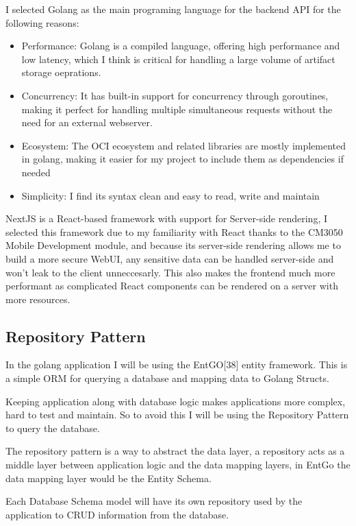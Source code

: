 \documentclass{article}
\begin{document}
  I selected Golang as the main programing language for the backend API for the following reasons:

  \begin{itemize}
    \item Performance: Golang is a compiled language, offering high performance and low latency, which I think is critical for handling a large volume of artifact storage oeprations.
    \item Concurrency: It has built-in support for concurrency through goroutines, making it perfect for handling multiple simultaneous requests without the need for an external webserver.
    \item Ecosystem: The OCI ecosystem and related libraries are mostly implemented in golang, making it easier for my project to include them as dependencies if needed
    \item Simplicity: I find its syntax clean and easy to read, write and maintain
  \end{itemize}

  NextJS is a React-based framework with support for Server-side rendering, I selected this framework due to my familiarity with React thanks to the CM3050 Mobile Development module, and because its server-side rendering allows me to build a more secure WebUI, any sensitive data can be handled server-side and won't leak to the client unneccesarly. This also makes the frontend much more performant as complicated React components can be rendered on a server with more resources.

  \subsection{Repository Pattern}

  In the golang application I will be using the EntGO[38] entity framework. This is a simple ORM for querying a database and mapping data to Golang Structs.

  Keeping application along with database logic makes applications more complex, hard to test and maintain. So to avoid this I will be using the Repository Pattern to query the database.

  The repository pattern is a way to abstract the data layer, a repository acts as a middle layer between application logic and the data mapping layers, in EntGo the data mapping layer would be the Entity Schema.

  Each Database Schema model will have its own repository used by the application to CRUD information from the database. 
\end{document}
